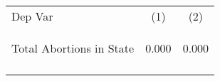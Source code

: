 \begin{center}
\begin{tabular}{lcc}
\hline \noalign{\smallskip}Dep Var & (1) & (2)\\
\noalign{\smallskip}\hline \noalign{\smallskip}Total Abortions in State & \begin{scriptsize}0.000\end{scriptsize} & \begin{scriptsize}0.000\end{scriptsize}\\
\noalign{\smallskip}\hline\end{tabular}\\
\end{center}
